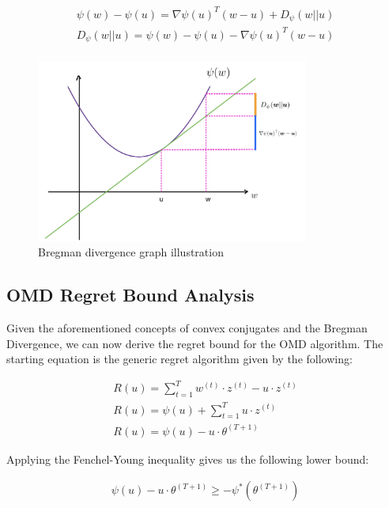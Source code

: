 \documentclass[11pt]{article}
\begin{document}
\begin{gather*}
    \psi (w) - \psi (u) = \nabla \psi(u)^T (w-u) + D_{\psi}(w||u) \\ 
    D_{\psi}(w||u) = \psi(w) - \psi(u) - \nabla \psi(u)^T (w-u) \\ 
\end{gather*}

\begin{figure}[H]
    \centering
    \includegraphics[width=0.8\textwidth]{f4.jpg}
    \caption{Bregman divergence graph illustration}
    \label{fig:bregman_divergence_graph}
\end{figure}

\subsection{OMD Regret Bound Analysis}

Given the aforementioned concepts of convex conjugates and the Bregman Divergence, we can now derive the regret bound for the OMD algorithm. The starting equation is the generic regret algorithm given by the following:

\begin{gather*}
    R(u) = \sum_{t=1}^T w^{(t)} \cdot z^{(t)}  - u \cdot z^{(t)}\\ 
    R(u) = \psi (u) + \sum_{t=1}^T u \cdot z^{(t)} \\ 
    R(u) = \psi (u) - u \cdot \theta^{(T+1)}
\end{gather*}

Applying the Fenchel-Young inequality gives us the following lower bound:

\begin{gather*}
    \psi (u) - u \cdot \theta^{(T+1)} \geq -\psi^* (\theta^{(T+1)})
\end{gather*}
\end{document}
